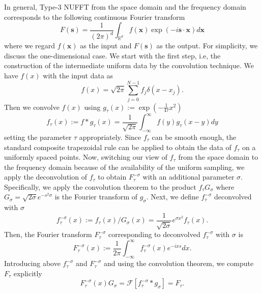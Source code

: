 In general, Type-$3$ NUFFT from the space domain and the frequency domain corresponds to the following continuous Fourier transform
\begin{equation}
    F(\bm{s})
  = \frac{1}{(2\pi)^d} \int_{\mathbb{R}^d}^{}
    f(\bm{x})\exp(-i\bm{s}\cdot\bm{x}) d\bm{x}
\end{equation}
where we regard $f(\bm{x})$ as the input and $F(\bm{s})$ as the output.
For simplicity, we discuss the one-dimensional case.
We start with the first step, i.e, the construction of the intermediate uniform data by the convolution technique.
We have $f(x)$ with the input data as
\begin{equation}
  f(x) = \sqrt{2\pi}\sum_{j=0}^{N-1}f_j\delta(x-x_j).
\end{equation}
Then we convolve $f(x)$ using $g_{\tau}(x) := \exp(-\frac{1}{4\tau}x^2)$
\begin{equation}
    f_{\tau}(x) := f\ast g_{\tau} (x)
  = \frac{1}{\sqrt{2\pi}} \int_{-\infty}^{\infty} f(y)g_{\tau}(x-y) dy
\end{equation}
setting the parameter $\tau$ appropriately.
Since $f_{\tau}$ can be smooth enough, the standard composite trapezoidal rule can be applied to obtain the data of $f_{\tau}$ on a uniformly spaced points.
Now, switching our view of $f_{\tau}$ from the space domain to the frequency domain because of the availability of the uniform sampling, we apply the deconvolution of $f_{\tau}$ to obtain $F_{\tau}^{-\sigma}$ with an additional parameter $\sigma$.
Specifically, we apply the convolution theorem to the product $f_{\tau}G_{\sigma}$
where $G_{\sigma} = \sqrt{2\sigma}e^{-s^2\sigma}$ is the Fourier transform of $g_{\sigma}$.
Next, we define $f_{\tau}^{-\sigma}$ deconvolved with $\sigma$
\begin{equation}
    f_{\tau}^{-\sigma}(x) := f_{\tau}(x)/G_{\sigma}(x)
  = \frac{1}{\sqrt{2\sigma}}e^{\sigma x^2}f_{\tau}(x).
\end{equation}
Then, the Fourier transform $F_{\tau}^{-\sigma}$ corresponding to deconvolved $f_{\tau}^{-\sigma}$
with $\sigma$ is
\begin{equation}
     F_{\tau}^{-\sigma}(x)
  := \frac{1}{2\pi} \int_{-\infty}^{\infty} f_{\tau}^{-\sigma}(x) e^{-ixs} dx.
\end{equation}
Introducing above $f_{\tau}^{-\sigma}$ and $F_{\tau}^{-\sigma}$ and using the convolution theorem,
we compute $F_{\tau}$ explicitly
\begin{equation}
     F_{\tau}^{-\sigma}(x)G_{\sigma}
   = \mathcal{F}[f_{\tau}^{-\sigma}\ast g_{\sigma}]
   = F_{\tau}.
\end{equation}
